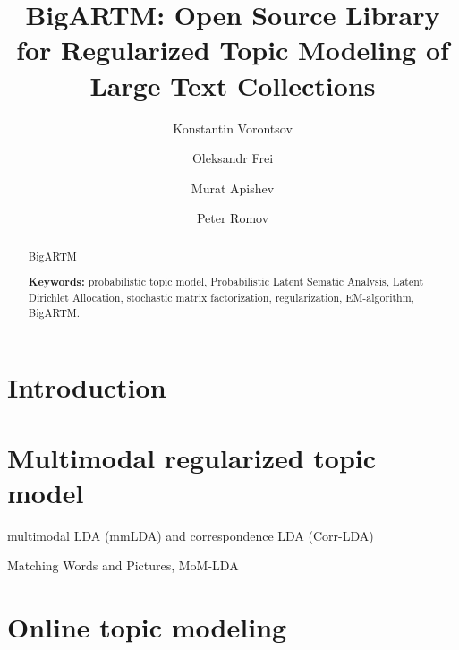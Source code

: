 \documentclass{llncs}
\begin{document}
\title{
    BigARTM: Open Source Library for 
    Regularized %
    Topic Modeling
    of Large Text Collections
}
\author{
    Konstantin Vorontsov
    \and
    Oleksandr Frei
    \and
    Murat Apishev
    \and
    Peter Romov
}

\maketitle

\begin{abstract}
    BigARTM

\vspace{1em}
\textbf{Keywords:}
    probabilistic topic model,
    Probabilistic Latent Sematic Analysis,
    Latent Dirichlet Allocation,
    stochastic matrix factorization,
    regularization,
    EM-algorithm,
    BigARTM.
\end{abstract}

\section{Introduction}
\cite{hofmann99plsi}
\cite{blei03latent}
\cite{asuncion09smoothing}

\cite{voron14dan-eng}
\cite{voron14aist}
\cite{voron14mlj}

\section{Multimodal regularized topic model}
\label{sec:Multimodal}

multimodal LDA (mmLDA) and correspondence LDA (Corr-LDA)
\cite{blei03modeling}

Matching Words and Pictures, MoM-LDA 
\cite{barnard03matching}

\cite{rubin12statistical}

\cite{virtanen12factorized}

\cite{roller13multimodal}


\section{Online topic modeling}
\label{sec:Online}
\end{document}

